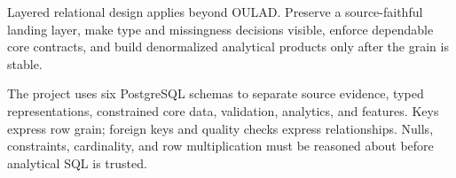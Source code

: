 \transferheading
Layered relational design applies beyond OULAD. Preserve a source-faithful
landing layer, make type and missingness decisions visible, enforce dependable
core contracts, and build denormalized analytical products only after the
grain is stable.

\begin{summarybox}
The project uses six PostgreSQL schemas to separate source evidence, typed
representations, constrained core data, validation, analytics, and features.
Keys express row grain; foreign keys and quality checks express relationships.
Nulls, constraints, cardinality, and row multiplication must be reasoned about
before analytical SQL is trusted.
\end{summarybox}
